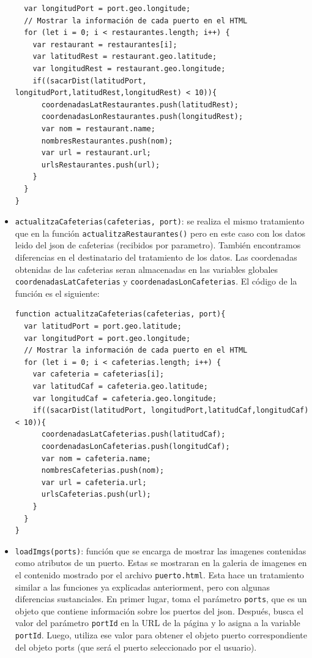 \documentclass{article}
\begin{document}
\begin{itemize}
\begin{verbatim}
  var longitudPort = port.geo.longitude;
  // Mostrar la información de cada puerto en el HTML
  for (let i = 0; i < restaurantes.length; i++) {
    var restaurant = restaurantes[i];
    var latitudRest = restaurant.geo.latitude;
    var longitudRest = restaurant.geo.longitude;
    if((sacarDist(latitudPort, longitudPort,latitudRest,longitudRest) < 10)){
      coordenadasLatRestaurantes.push(latitudRest);
      coordenadasLonRestaurantes.push(longitudRest);
      var nom = restaurant.name;
      nombresRestaurantes.push(nom);
      var url = restaurant.url;
      urlsRestaurantes.push(url);
    }
  }
}
    \end{verbatim}
    \item \texttt{actualitzaCafeterias(cafeterias, port)}: se realiza el mismo tratamiento que en la función \texttt{actualitzaRestaurantes()} pero en este caso con los datos leido del json de cafeterias (recibidos por parametro). También encontramos diferencias en el destinatario del tratamiento de los datos. Las coordenadas obtenidas de las cafeterias seran almacenadas en las variables globales \texttt{coordenadasLatCafeterias} y \texttt{coordenadasLonCafeterias}. El código de la función es el siguiente:
    \begin{verbatim}
function actualitzaCafeterias(cafeterias, port){
  var latitudPort = port.geo.latitude;
  var longitudPort = port.geo.longitude;
  // Mostrar la información de cada puerto en el HTML
  for (let i = 0; i < cafeterias.length; i++) {
    var cafeteria = cafeterias[i];
    var latitudCaf = cafeteria.geo.latitude;
    var longitudCaf = cafeteria.geo.longitude;
    if((sacarDist(latitudPort, longitudPort,latitudCaf,longitudCaf) < 10)){
      coordenadasLatCafeterias.push(latitudCaf);
      coordenadasLonCafeterias.push(longitudCaf);
      var nom = cafeteria.name;
      nombresCafeterias.push(nom);
      var url = cafeteria.url;
      urlsCafeterias.push(url);
    }
  }
}
    \end{verbatim}

    \item \texttt{loadImgs(ports)}: función que se encarga de mostrar las imagenes contenidas como atributos de un puerto. Estas se mostraran en la galeria de imagenes en el contenido mostrado por el archivo \texttt{puerto.html}. Esta hace un tratamiento similar a las funciones ya explicadas anteriorment, pero con algunas diferencias sustanciales. En primer lugar, toma el parámetro \texttt{ports}, que es un objeto que contiene información sobre los puertos del json. Después, busca el valor del parámetro \texttt{portId} en la URL de la página y lo asigna a la variable \texttt{portId}. Luego, utiliza ese valor para obtener el objeto puerto correspondiente del objeto ports (que será el puerto seleccionado por el usuario).


\end{itemize}
\end{document}
